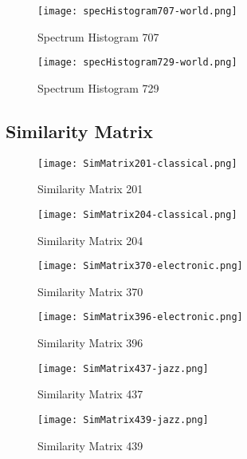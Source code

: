 \documentclass{article} %
\begin{document}
\begin{figure}[H]
\centering
\texttt{[image: specHistogram707-world.png]}
\caption{Spectrum Histogram 707}
\label{fig:hist707}
\end{figure}

\begin{figure}[H]
\centering
\texttt{[image: specHistogram729-world.png]}
\caption{Spectrum Histogram 729}
\label{fig:hist729}
\end{figure}
\clearpage






\subsection{Similarity Matrix}
\label{sec:Sim}


\begin{figure}[H]
\centering
\texttt{[image: SimMatrix201-classical.png]}
\caption{Similarity Matrix 201}
\label{fig:sim201_1}
\end{figure}

\begin{figure}[H]
\centering
\texttt{[image: SimMatrix204-classical.png]}
\caption{Similarity Matrix 204}
\label{fig:sim204_1}
\end{figure}


\begin{figure}[H]
\centering
\texttt{[image: SimMatrix370-electronic.png]}
\caption{Similarity Matrix 370}
\label{fig:sim370_1}
\end{figure}

\begin{figure}[H]
\centering
\texttt{[image: SimMatrix396-electronic.png]}
\caption{Similarity Matrix 396}
\label{fig:sim396_1}
\end{figure}

\begin{figure}[H]
\centering
\texttt{[image: SimMatrix437-jazz.png]}
\caption{Similarity Matrix 437}
\label{fig:sim437_1}
\end{figure}

\begin{figure}[H]
\centering
\texttt{[image: SimMatrix439-jazz.png]}
\caption{Similarity Matrix 439}
\label{fig:sim439_1}
\end{figure}
\end{document}
